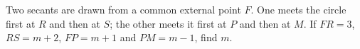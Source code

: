 Two secants are drawn from a common external point $F$. One meets the circle first at $R$ and then at $S$; the other meets it first at $P$ and then at $M$. If $FR=3$, $RS=m+2$, $FP=m+1$ and $PM=m-1$, find $m$.

